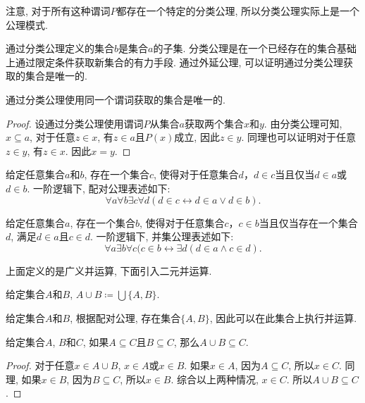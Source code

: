 注意, 对于所有这种谓词$P$都存在一个特定的分类公理, 所以分类公理实际上是一个公理模式.

通过分类公理定义的集合$b$是集合$a$的子集. 分类公理是在一个已经存在的集合基础上通过限定条件获取新集合的有力手段. 通过外延公理, 可以证明通过分类公理获取的集合是唯一的.

\begin{proposition}
	通过分类公理使用同一个谓词获取的集合是唯一的.
\end{proposition}

\begin{proof}
	设通过分类公理使用谓词$P$从集合$a$获取两个集合$x$和$y$. 由分类公理可知, $x\subseteq a$, 对于任意$z \in x$, 有$z\in a$且$P(x)$成立, 因此$z\in y$. 同理也可以证明对于任意$z \in y$, 有$z \in x$. 因此$x=y$.
\end{proof}

\begin{axiom}[配对公理]
	给定任意集合$a$和$b$, 存在一个集合$c$, 使得对于任意集合$d$，$d\in c$当且仅当$d\in a$或$d\in b$. 一阶逻辑下, 配对公理表述如下:
	\begin{equation}
		\forall a\forall b\exists c\forall d(d\in c\leftrightarrow d\in a\vee d\in b).
	\end{equation}
\end{axiom}

\begin{axiom}[并集公理]
	给定任意集合$a$, 存在一个集合$b$, 使得对于任意集合$c$，$c\in b$当且仅当存在一个集合$d$, 满足$d\in  a$且$c\in d$. 一阶逻辑下, 并集公理表述如下:
	\begin{equation}
		\forall a\exists b\forall c(c\in b\leftrightarrow \exists d(d\in a \wedge c\in d).
	\end{equation}
\end{axiom}

上面定义的是广义并运算, 下面引入二元并运算.

\begin{definition}
	给定集合$A$和$B$, $A\cup B\coloneq \bigcup\{A,B\}$.
\end{definition}

给定集合$A$和$B$, 根据配对公理, 存在集合$\{A,B\}$, 因此可以在此集合上执行并运算.

\begin{proposition}
	给定集合$A$, $B$和$C$, 如果$A\subseteq C$且$B\subseteq C$, 那么$A\cup B\subseteq C$.
\end{proposition}

\begin{proof}
	对于任意$x\in A\cup B$, $x\in A$或$x\in B$. 如果$x\in A$, 因为$A\subseteq C$, 所以$x\in C$. 同理,  如果$x\in B$, 因为$B\subseteq C$, 所以$x\in B$. 综合以上两种情况, $x\in C$. 所以$A\cup B\subseteq C$.
\end{proof}


